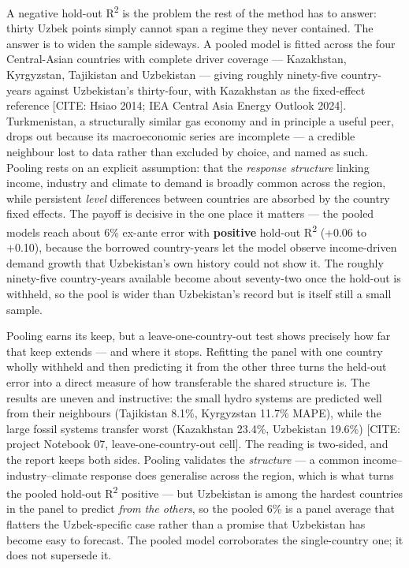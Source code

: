 \documentclass[10pt,twocolumn]{article}
\newcommand{\mk}[1]{{\color{amber}\small #1}}
\begin{document}
A negative hold-out R\textsuperscript{2} is the problem the rest of the method has to answer: thirty Uzbek points simply cannot span a regime they never contained. The answer is to widen the sample sideways. A pooled model is fitted across the four Central-Asian countries with complete driver coverage --- Kazakhstan, Kyrgyzstan, Tajikistan and Uzbekistan --- giving roughly ninety-five country-years against Uzbekistan's thirty-four, with Kazakhstan as the fixed-effect reference \mk{[CITE: Hsiao 2014; IEA Central Asia Energy Outlook 2024]}. Turkmenistan, a structurally similar gas economy and in principle a useful peer, drops out because its macroeconomic series are incomplete --- a credible neighbour lost to data rather than excluded by choice, and named as such. Pooling rests on an explicit assumption: that the \textit{response structure} linking income, industry and climate to demand is broadly common across the region, while persistent \textit{level} differences between countries are absorbed by the country fixed effects. The payoff is decisive in the one place it matters --- the pooled models reach about 6\% ex-ante error with \textbf{positive} hold-out R\textsuperscript{2} (+0.06 to +0.10), because the borrowed country-years let the model observe income-driven demand growth that Uzbekistan's own history could not show it. The roughly ninety-five country-years available become about seventy-two once the hold-out is withheld, so the pool is wider than Uzbekistan's record but is itself still a small sample.

Pooling earns its keep, but a leave-one-country-out test shows precisely how far that keep extends --- and where it stops. Refitting the panel with one country wholly withheld and then predicting it from the other three turns the held-out error into a direct measure of how transferable the shared structure is. The results are uneven and instructive: the small hydro systems are predicted well from their neighbours (Tajikistan 8.1\%, Kyrgyzstan 11.7\% MAPE), while the large fossil systems transfer worst (Kazakhstan 23.4\%, Uzbekistan 19.6\%) \mk{[CITE: project Notebook 07, leave-one-country-out cell]}. The reading is two-sided, and the report keeps both sides. Pooling validates the \textit{structure} --- a common income--industry--climate response does generalise across the region, which is what turns the pooled hold-out R\textsuperscript{2} positive --- but Uzbekistan is among the hardest countries in the panel to predict \textit{from the others}, so the pooled 6\% is a panel average that flatters the Uzbek-specific case rather than a promise that Uzbekistan has become easy to forecast. The pooled model corroborates the single-country one; it does not supersede it.
\end{document}
